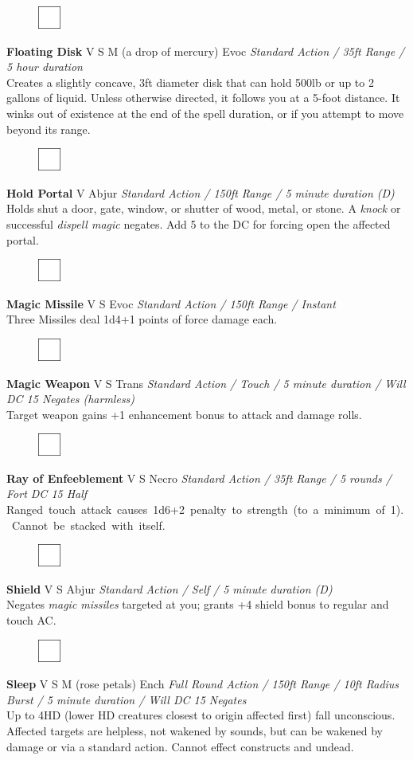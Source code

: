 \documentclass[letterpaper]{article}
\newcommand{\spell}[7]{
\begin{figure}
\vspace{-13pt}
\ifstrequal{#2}{Full}{\includegraphics[width=2em]{Checkbox-Full}}{
                      \includegraphics[width=2em]{Checkbox}}
\ifstrequal{#7}{}{\vspace{-1em}}{\vspace{#7}}
\end{figure}
\noindent \textbf{#1} #3 {
    \ifstrequal{#4}{Conj}{\color{Plum}Conj}{%
    \ifstrequal{#4}{Divin}{\color{YellowOrange}Divin}{%
    \ifstrequal{#4}{Ench}{\color{VioletRed}Ench}{%
    \ifstrequal{#4}{Trans}{\color{LimeGreen}Trans}{%
    \ifstrequal{#4}{Evoc}{\color{RedOrange}Evoc}{%
    \ifstrequal{#4}{Illu}{\color{ProcessBlue}Illu}{%
    \ifstrequal{#4}{Abjur}{\color{CadetBlue}Abjur}{%
    \ifstrequal{#4}{Necro}{\color{Red}Necro}{%
}}}}}}}}}
{\footnotesize \emph{#5}} \\
#6
}
\begin{document}
\spell{Floating Disk}{}{V S M (a drop of mercury)}{Evoc}{Standard Action / 35ft Range / 5 hour duration}{%
Creates a slightly concave, 3ft diameter disk that can hold 500lb or up to 2 gallons of liquid. Unless otherwise directed, it follows you at a 5-foot distance.  It winks out of existence at the end of the spell duration, or if you attempt to move beyond its range.}{0em} %

\spell{Hold Portal}{}{V}{Abjur}{Standard Action / 150ft Range / 5 minute duration (D)}{%
Holds shut a door, gate, window, or shutter of wood, metal, or stone.  A \emph{knock} or successful \emph{dispell magic} negates. Add 5 to the DC for forcing open the affected portal.}{} %

\spell{Magic Missile}{}{V S}{Evoc}{Standard Action / 150ft Range / Instant}{%
Three Missiles deal 1d4+1 points of force damage each.}{} \\[-1em] %

\spell{Magic Weapon}{}{V S}{Trans}{Standard Action / Touch / 5 minute duration / Will DC 15 Negates \mbox{(harmless)}}{%
Target weapon gains +1 enhancement bonus to attack and damage rolls.}{}\\[-1em] %

\spell{Ray of Enfeeblement}{}{V S}{Necro}{Standard Action / 35ft Range / 5 rounds / Fort DC 15 Half}{%
\mbox{Ranged touch attack causes 1d6+2 penalty to strength (to a minimum of 1).  Cannot be stacked with itself.}}{} \\[-1em] %

\spell{Shield}{}{V S}{Abjur}{Standard Action / Self / 5 minute duration (D)}{%
Negates \emph{magic missiles} targeted at you; grants +4 shield bonus to regular and touch AC.}{}\\[-1em] %

\spell{Sleep}{}{V S M (rose petals)}{Ench}{Full Round Action / 150ft Range / 10ft Radius Burst / 5 minute duration / Will DC 15 \nolinebreak Negates}{%
Up to 4HD (lower HD creatures closest to origin affected first) fall unconscious.  Affected targets are helpless, not wakened by sounds, but can be wakened by damage or via a standard action. Cannot effect constructs and undead.}{}\\[-1em] %
\end{document}

